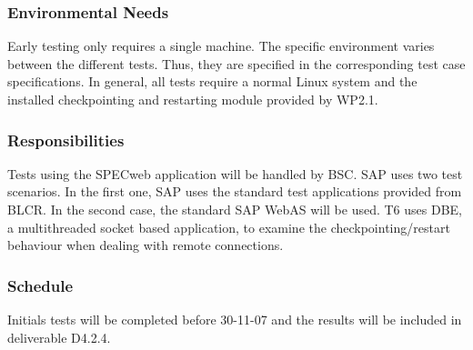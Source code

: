 \subsubsection{Environmental Needs}
Early testing only requires a single machine. The specific environment varies between the different tests. Thus, they are specified in the corresponding test case specifications. In general, all tests require a normal Linux system and the installed checkpointing and restarting module provided by WP2.1.

\subsubsection{Responsibilities}
Tests using the SPECweb application will be handled by BSC. SAP uses two test scenarios. In the first one, SAP uses the standard test applications provided from BLCR. In the second case, the standard SAP WebAS will be used. T6 uses DBE, a multithreaded socket based application, to examine the checkpointing/restart behaviour when dealing with remote connections.

\subsubsection{Schedule}
Initials tests will be completed before 30-11-07 and the results will be included in deliverable D4.2.4.

